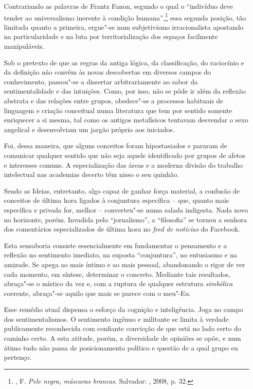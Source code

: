 Contrariando as palavras de Frantz Fanon, segundo o qual o ``indivíduo
deve tender ao universalismo inerente à condição humana'',\footnote{,
  F. \emph{Pele negra, máscaras brancas}. Salvador: , 2008, p. 32.}
essa segunda posição, tão limitada quanto a primeira, ergue"-se num
subjetivismo irracionalista apostando na particularidade e na luta por
territorialização dos espaços facilmente manipuláveis.

Sob o pretexto de que as regras da antiga lógica, da classificação, do
raciocínio e da definição não convêm às novas descobertas em diversos
campos do conhecimento, passou"-se a dissertar arbitrariamente ao sabor
da sentimentalidade e das intuições. Como, por isso, não se pôde ir além
da reflexão abstrata e das relações entre grupos, obedece"-se a processos
habituais de linguagem e criação conceitual numa literatura que tem por
sentido somente enriquecer a si mesma, tal como os antigos metafísicos
tentavam desvendar o sexo angelical e desenvolviam um jargão próprio aos
iniciados.

Foi, dessa maneira, que alguns conceitos foram hipostasiados e pararam
de comunicar qualquer sentido que não seja aquele identificado por
grupos de afetos e interesses comuns. A especialização das áreas e a
moderna divisão do trabalho intelectual nas academias decerto têm nisso
o seu quinhão.

Sendo as Ideias, entretanto, algo capaz de ganhar força material, a
confusão de conceitos de última hora ligados à conjuntura específica --
que, quanto mais específica e privada for, melhor -- converteu"-se numa
salada indigesta. Nada novo no horizonte, porém. Invadida pelo
``jornalismo'', a ``filosofia'' se tornou a senhora dos comentários
especializados de última hora no \emph{feed de notícias} do Facebook.

Esta sensaboria consiste essencialmente em fundamentar o pensamento e a
reflexão no sentimento imediato, na suposta ``conjuntura'', no
entusiasmo e na amizade. Se apega ao mais íntimo e ao mais pessoal,
abandonando o rigor de ver cada momento, em síntese, determinar o
concreto. Mediante tais resultados, abraça"-se o místico da vez e, com a
ruptura de qualquer estrutura \emph{simbólica} coerente, abraça"-se
aquilo que mais se parece com o meu"-Eu.

Esse remédio atual dispensa o esforço da cognição e inteligência. Joga
no campo dos sentimentalismos. O sentimento ingênuo e militante se
limita à verdade publicamente reconhecida com confiante convicção de que
está no lado certo do caminho certo. A esta atitude, porém, a
diversidade de opiniões se opõe, e num átimo tudo não passa de
posicionamento político e questão de a qual grupo eu pertenço.

